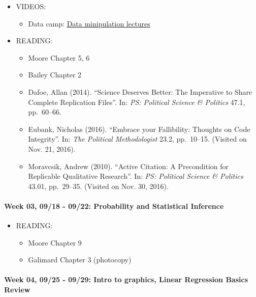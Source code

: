 \documentclass[11pt,]{article}
\providecommand{\tightlist}{%
  \setlength{\itemsep}{0pt}\setlength{\parskip}{0pt}}
\begin{document}
\begin{itemize}
\tightlist
\item
  VIDEOS:

  \begin{itemize}
  \tightlist
  \item
    Data camp:
    \href{https://www.datacamp.com/courses/dplyr-data-manipulation-r-tutorial}{Data
    minipulation lectures}
  \end{itemize}
\item
  READING:

  \begin{itemize}
  \item
    Moore Chapter 5, 6
  \item
    Bailey Chapter 2
  \item
     Dafoe, Allan (2014). ``Science Deserves Better:
    The Imperative to Share Complete Replication Files''. In:
    \emph{PS: Political Science \& Politics} 47.1, pp.~60--66.
  \item
     Eubank, Nicholas (2016). ``Embrace your
    Fallibility: Thoughts on Code Integrity''. In:
    \emph{The Political Methodologist} 23.2, pp.~10--15. (Visited on
    Nov. 21, 2016).
  \item
     Moravcsik, Andrew (2010). ``Active Citation: A
    Precondition for Replicable Qualitative Research''. In:
    \emph{PS: Political Science \& Politics} 43.01, pp.~29--35. (Visited
    on Nov. 30, 2016).
  \end{itemize}
\end{itemize}

\paragraph{Week 03, 09/18 - 09/22: Probability and Statistical
Inference}\label{week-03-0918---0922-probability-and-statistical-inference}

\begin{itemize}
\tightlist
\item
  READING:

  \begin{itemize}
  \tightlist
  \item
    Moore Chapter 9
  \item
    Galimard Chapter 3 (photocopy)
  \end{itemize}
\end{itemize}

\paragraph{Week 04, 09/25 - 09/29: Intro to graphics, Linear Regression
Basics
Review}\label{week-04-0925---0929-intro-to-graphics-linear-regression-basics-review}
\end{document}
